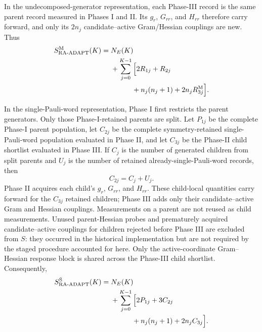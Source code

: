 \documentclass[
  reprint,
  amsmath,
  amssymb,
  aps,
  pra,
  nofootinbib,
  superscriptaddress,
  floatfix
]{revtex4-2}
\begin{document}
In the undecomposed-generator representation, each Phase-III record is the same parent record
measured in Phases I and II. Its \(g_r\), \(G_{rr}\), and \(H_{rr}\) therefore
carry forward, and only its \(2n_j\) candidate--active Gram/Hessian couplings
are new. Thus
\begin{align}
S_{\mathrm{RA\text{-}ADAPT}}^{\rm M}(K)
={}&N_E(K)
\nonumber\\
&+\sum_{j=0}^{K-1}
\Big[
2R_{1j}+R_{2j}
\nonumber\\
&\hspace{3em}
+n_j(n_j+1)+2n_jR_{3j}^{\rm M}
\Big].
\label{eq:appendix_s_ra_adapt_macro}
\end{align}

In the single-Pauli-word representation, Phase I first restricts the parent
generators.
Only those Phase-I-retained parents are split. Let \(P_{1j}\) be the complete
Phase-I parent population, let \(C_{2j}\) be the complete symmetry-retained
single-Pauli-word population evaluated in Phase II, and let \(C_{3j}\) be the
Phase-II child shortlist evaluated in Phase III. If \(C_j\) is the number of
generated children from split parents and \(U_j\) is the number of retained
already-single-Pauli-word records, then
\begin{equation}
C_{2j}=C_j+U_j.
\label{eq:appendix_projected_phase3_population}
\end{equation}
Phase II acquires each child's \(g_r\), \(G_{rr}\), and \(H_{rr}\). These
child-local quantities carry forward for the \(C_{3j}\) retained children;
Phase III adds only their candidate--active Gram and Hessian couplings.
Measurements on a parent are not reused as child measurements. Unused
parent-Hessian probes and prematurely acquired candidate--active couplings for
children rejected before Phase III are excluded from \(S\): they occurred in
the historical implementation but are not required by the staged procedure
accounted for here.
Only the active-coordinate Gram--Hessian response block is shared across the
Phase-III child shortlist.
Consequently,
\begin{align}
S_{\mathrm{RA\text{-}ADAPT}}^{\rm S}(K)
={}&N_E(K)
\nonumber\\
&+\sum_{j=0}^{K-1}
\Big[
2P_{1j}+3C_{2j}
\nonumber\\
&\hspace{3em}
+n_j(n_j+1)+2n_jC_{3j}
\Big].
\label{eq:appendix_s_snake_singleton}
\end{align}
\end{document}
